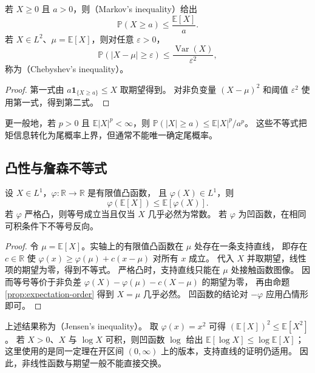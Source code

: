 \documentclass[UTF8]{ctexart}
\begin{document}
\begin{proposition}[尾概率控制]
\label{prop:expectation-tail-bounds}
若 $X\geq0$ 且 $a>0$，则（Markov's inequality）给出
\[
  \mathbb P(X\geq a)\leq\frac{\mathbb E[X]}{a}.
\]
若 $X\in L^2$、$\mu=\mathbb E[X]$，则对任意 $\varepsilon>0$，
\[
  \mathbb P(|X-\mu|\geq\varepsilon)
  \leq\frac{\operatorname{Var}(X)}{\varepsilon^2},
\]
称为（Chebyshev's inequality）。
\end{proposition}

\begin{proof}
第一式由 $a\mathbf1_{\{X\geq a\}}\leq X$ 取期望得到。
对非负变量 $(X-\mu)^2$ 和阈值 $\varepsilon^2$ 使用第一式，得到第二式。
\end{proof}

更一般地，若 $p>0$ 且 $\mathbb E|X|^p<\infty$，则
$\mathbb P(|X|\geq a)\leq\mathbb E|X|^p/a^p$。
这些不等式把矩信息转化为尾概率上界，但通常不能唯一确定尾概率。

\subsection{凸性与詹森不等式}

\begin{theorem}[詹森不等式]
\label{thm:expectation-jensen}
设 $X\in L^1$，$\varphi:\mathbb R\to\mathbb R$ 是有限值凸函数，
且 $\varphi(X)\in L^1$，则
\begin{equation}
  \varphi(\mathbb E[X])\leq\mathbb E[\varphi(X)].
  \label{eq:expectation-jensen}
\end{equation}
若 $\varphi$ 严格凸，则等号成立当且仅当 $X$ 几乎必然为常数。
若 $\varphi$ 为凹函数，在相同可积条件下不等号反向。
\end{theorem}

\begin{proof}
令 $\mu=\mathbb E[X]$。实轴上的有限值凸函数在 $\mu$ 处存在一条支持直线，
即存在 $c\in\mathbb R$ 使
$\varphi(x)\geq\varphi(\mu)+c(x-\mu)$ 对所有 $x$ 成立。
代入 $X$ 并取期望，线性项的期望为零，得到不等式。
严格凸时，支持直线只能在 $\mu$ 处接触函数图像。
因而等号等价于非负差
$\varphi(X)-\varphi(\mu)-c(X-\mu)$ 的期望为零，
再由命题 \ref{prop:expectation-order} 得到 $X=\mu$ 几乎必然。
凹函数的结论对 $-\varphi$ 应用凸情形即可。
\end{proof}

上述结果称为（Jensen's inequality）。
取 $\varphi(x)=x^2$ 可得 $(\mathbb E[X])^2\leq\mathbb E[X^2]$。
若 $X>0$、$X$ 与 $\log X$ 可积，则凹函数 $\log$ 给出
$\mathbb E[\log X]\leq\log\mathbb E[X]$；
这里使用的是同一定理在开区间 $(0,\infty)$ 上的版本，支持直线的证明仍适用。
因此，非线性函数与期望一般不能直接交换。
\end{document}
